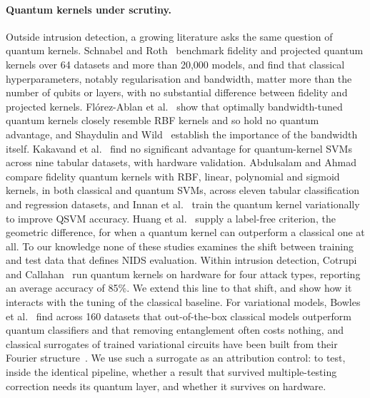\documentclass[preprint,11pt]{elsarticle}
\begin{document}
\paragraph{Quantum kernels under scrutiny.}
Outside intrusion detection, a growing literature asks the same question of quantum kernels. Schnabel
and Roth~\cite{schnabel2025scrutiny} benchmark fidelity and projected quantum kernels over 64 datasets and
more than 20{,}000 models, and find that classical hyperparameters, notably regularisation and bandwidth,
matter more than the number of qubits or layers, with no substantial difference between fidelity and
projected kernels. Fl\'orez-Ablan et al.~\cite{florezablan2025similarity} show that optimally bandwidth-tuned
quantum kernels closely resemble RBF kernels and so hold no quantum advantage, and Shaydulin and
Wild~\cite{shaydulin2022bandwidth} establish the importance of the bandwidth itself. Kakavand
et al.~\cite{kakavand2026benchmarking} find no significant advantage for quantum-kernel SVMs across nine
tabular datasets, with hardware validation. Abdulsalam and Ahmad~\cite{abdulsalam2025comparative}
compare fidelity quantum kernels with RBF, linear, polynomial and sigmoid kernels, in both classical and
quantum SVMs, across eleven tabular classification and regression datasets, and Innan
et al.~\cite{innan2023variational} train the quantum kernel variationally to improve QSVM accuracy.
Huang et al.~\cite{huang2021power} supply a label-free criterion, the geometric difference, for when a
quantum kernel can outperform a classical one at all.
To our knowledge none of these studies examines the shift between training and test data that defines
NIDS evaluation. Within intrusion detection, Cotrupi and Callahan~\cite{cotrupi2025practical}
run quantum kernels on hardware for four attack types, reporting an average accuracy of 85\%. We extend this line to that shift, and show how it interacts with the tuning of the classical baseline.
For variational models, Bowles et al.~\cite{bowles2024better} find across 160 datasets that out-of-the-box
classical models outperform quantum classifiers and that removing entanglement often costs nothing, and
classical surrogates of trained variational circuits have been built from their Fourier
structure~\cite{schuld2021encoding,schreiber2023surrogates,landman2023classically}. We use such a
surrogate as an attribution control: to test, inside the identical pipeline, whether a result that
survived multiple-testing correction needs its quantum layer, and whether it survives on hardware.
\end{document}
